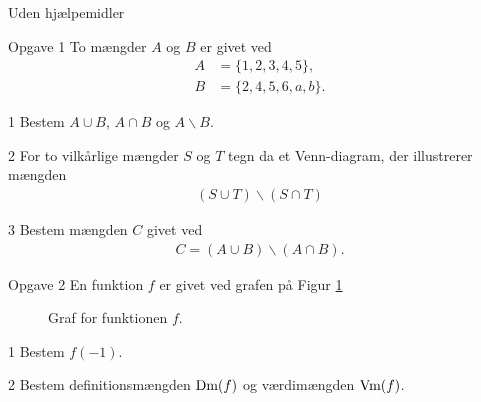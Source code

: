 \begin{center}
	\LARGE
	Uden hjælpemidler
\end{center}
\begin{opgavetekst}{Opgave 1}
	To mængder $A$ og $B$ er givet ved
	\begin{align*}
		A &= \{1,2,3,4,5\}, \\
		B &= \{2,4,5,6,a,b\}.
	\end{align*}
\end{opgavetekst}
\begin{delopgave}{}{1}
	Bestem $A \cup B$, $A \cap B$ og $A \backslash B$. 
\end{delopgave}
\begin{delopgave}{}{2}
	For to vilkårlige mængder $S$ og $T$ tegn da et Venn-diagram, der illustrerer mængden 
	\begin{align*}
		(S\cup T)\backslash (S\cap T)
	\end{align*}
\end{delopgave}
\begin{delopgave}{}{3}
	Bestem mængden $C$ givet ved
	\begin{align*}
		C = (A\cup B)\backslash (A \cap B).
	\end{align*}
\end{delopgave}
\begin{opgavetekst}{Opgave 2}
	En funktion $f$ er givet ved grafen på Figur \ref{fig:defværd}
	\begin{figure}[H]	
	\centering
	\caption{Graf for funktionen $f$.}
	\label{fig:defværd}
	\end{figure}
	\phantom{h}
\end{opgavetekst}
\begin{delopgave}{}{1}
	Bestem $f(-1)$.
\end{delopgave}
\begin{delopgave}{}{2}
	Bestem definitionsmængden $\textnormal{Dm}(f)$ og værdimængden $\textnormal{Vm}(f)$.
\end{delopgave}

